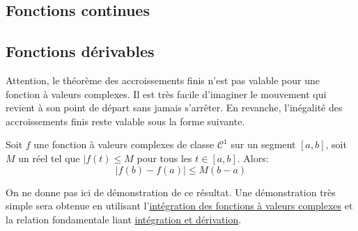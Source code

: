 \subsection{Fonctions continues}
\subsection{Fonctions dérivables}
Attention, le théorème des accroissements finis n'est pas valable pour une fonction à valeurs complexes. Il est très facile d'imaginer le mouvement qui revient à son point de départ sans jamais s'arrêter. En revanche, l'inégalité des accroissements finis reste valable sous la forme suivante.
\begin{prop}
 Soit $f$ une fonction à valeurs complexes de classe $\mathcal C^1$ sur un segment $[a,b]$, soit $M$ un réel tel que $|f(t)\leq M$ pour tous les $t\in[a,b]$. Alors:
\begin{displaymath}
 |f(b)-f(a)|\leq M(b-a)
\end{displaymath}
\end{prop}
\begin{demo}
 On ne donne pas ici de démonstration de ce résultat. Une démonstration très simple sera obtenue en utilisant l'\href{\baseurl C2189.pdf}{intégration des fonctions à valeurs complexes} et la relation fondamentale liant \href{\baseurl C2190.pdf}{intégration et dérivation}.
\end{demo}




